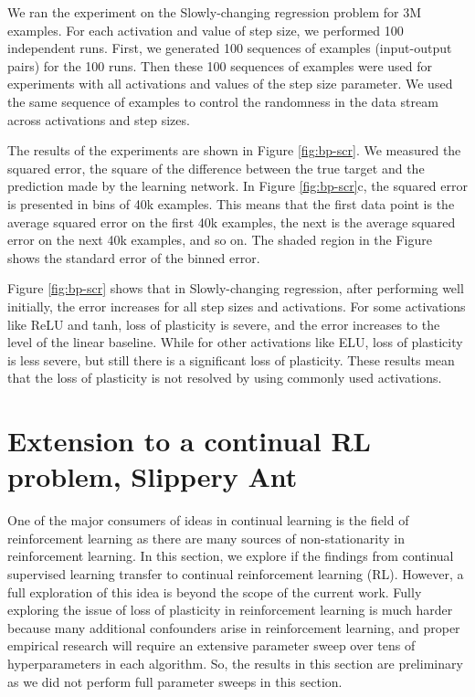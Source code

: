 \documentclass[review, number,3p]{elsarticle}
\begin{document}
We ran the experiment on the Slowly-changing regression problem for 3M examples. 
For each activation and value of step size, we performed 100 independent runs.
First, we generated 100 sequences of examples (input-output pairs) for  the 100 runs.
Then these 100 sequences of examples were used for experiments with all activations and values of the step size parameter.
We used the same sequence of examples to control the randomness in the data stream across activations and step sizes. 

The results of the experiments are shown in Figure \ref{fig:bp-scr}.
We measured the squared error, the square of the difference between the true target and the prediction made by the learning network.
In Figure \ref{fig:bp-scr}c, the squared error is presented in bins of 40k examples. 
This means that the first data point is the average squared error on the first 40k examples, the next is the average squared error on the next 40k examples, and so on.
The shaded region in the Figure shows the standard error of the binned error.


Figure \ref{fig:bp-scr} shows that in Slowly-changing regression, after performing well initially, the error increases for all step sizes and activations.
For some activations like ReLU and tanh, loss of plasticity is severe, and the error increases to the level of the linear baseline.
While for other activations like ELU, loss of plasticity is less severe, but still there is a significant loss of plasticity.
These results mean that the loss of plasticity is not resolved by using commonly used activations.

\section{Extension to a continual RL problem, Slippery Ant}
\label{sec:crl}

One of the major consumers of ideas in continual learning is the field of reinforcement learning as there are many sources of non-stationarity in reinforcement learning.
In this section, we explore if the findings from continual supervised learning transfer to continual reinforcement learning (RL).
However, a full exploration of this idea is beyond the scope of the current work.
Fully exploring the issue of loss of plasticity in reinforcement learning is much harder because many additional confounders arise in reinforcement learning, and proper empirical research will require an extensive parameter sweep over tens of hyperparameters in each algorithm.
So, the results in this section are preliminary as we did not perform full parameter sweeps in this section.
\end{document}
